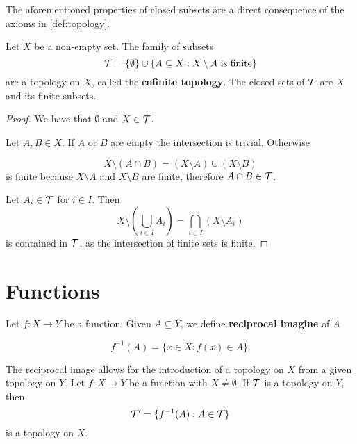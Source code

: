 \documentclass[../../main/main.tex]{subfiles}
\begin{document}
\begin{remark}
  The aforementioned properties of closed subsets are a direct consequence of the axioms in \ref{def:topology}.
\end{remark}

\begin{example}
  Let $X$ be a non-empty set. The family of subsets
  \begin{equation*}
    \mathcal{T} = \{ \emptyset \} \cup \{A \subseteq X: X \setminus A \text{ is finite}\}
  \end{equation*}
  are a topology on $X$, called the {\bf cofinite topology}. The closed sets of $\mathcal{T}$ are $X$ and its finite subsets.
\end{example}

\begin{proof}
  We have that $\emptyset$ and $X \in \mathcal{T}$.

  Let $A, B \in X$. If $A$ or $B$ are empty the intersection is trivial. Otherwise

  \begin{equation*}
    X \setminus (A \cap B) = \left( X \setminus A \right) \cup \left( X \setminus B \right)
  \end{equation*}
  is finite because $X \setminus A$ and $X \setminus B$ are finite, therefore $A \cap B \in \mathcal{T}$.

  Let $A_{i} \in \mathcal{T}$ for $i \in I$. Then
  \begin{equation*}
    X \setminus \left( \bigcup_{i \in I} A_{i} \right) =
    \bigcap_{i \in I} \left( X \setminus A_{i} \right)
  \end{equation*}
  is contained in $\mathcal{T}$, as the intersection of finite sets is finite.
\end{proof}

\section{Functions}
\label{sec:function}

\begin{definition}
Let $f: X \rightarrow Y$ be a function. Given $A \subseteq Y$, we define {\bf reciprocal imagine} of $A$

\begin{equation*}
  f^{-1} (A) = \{x \in X : f(x) \in A\}.
\end{equation*}
\end{definition}

\begin{remark}
The reciprocal image allows for the introduction of a topology on $X$ from a given topology on $Y$. Let $f: X \rightarrow Y$ be a function with $X \neq \emptyset$. If $\mathcal{T}$ is a topology on $Y$, then
  \begin{equation*}
    \mathcal{T}' = \{f^{-1}(A) : A \in \mathcal{T}\}
  \end{equation*}
  is a topology on $X$.
\end{remark}
\end{document}
